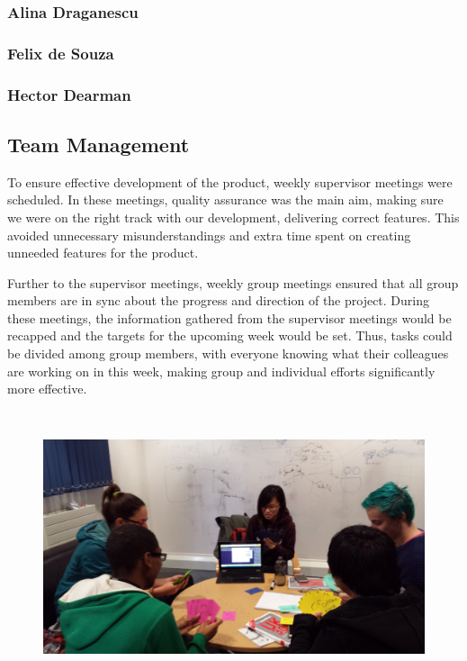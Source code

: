 \documentclass[11pt, a4paper]{article}
\begin{document}
\subsubsection{Alina Draganescu}
\subsubsection{Felix de Souza}
\subsubsection{Hector Dearman}
\subsection{Team Management}

To ensure effective development of the product, weekly supervisor meetings were scheduled.
In these meetings, quality assurance was the main aim, making sure we were on the right track with our development, delivering correct features. 
This avoided unnecessary misunderstandings and extra time spent on creating unneeded features for the product. 

Further to the supervisor meetings, weekly group meetings ensured that all group members are in sync about the progress and direction of the project. 
During these meetings, the information gathered from the supervisor meetings would be recapped and the targets for the upcoming week would be set. 
Thus, tasks could be divided among group members, with everyone knowing what their colleagues are working on in this week, making group and individual efforts significantly more effective.
\begin{figure}[h!]
\centering
\includegraphics[height=80mm,width=130mm]{estimation.jpg}
\end{figure}
\end{document}
